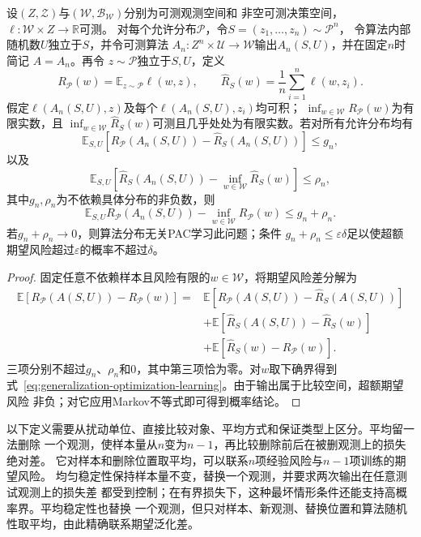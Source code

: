 \begin{theorem}[期望泛化差与经验最优性]
\label{thm:generalization-optimization-learning}
设$(Z,\mathcal Z)$与$(\mathcal W,\mathcal B_{\mathcal W})$分别为可测观测空间和
非空可测决策空间，$\ell:\mathcal W\times Z\to\mathbb R$可测。
对每个允许分布$\mathcal P$，令$S=(z_1,\ldots,z_n)\sim\mathcal P^n$，
令算法内部随机数$U$独立于$S$，并令可测算法
$A_n:Z^n\times\mathcal U\to\mathcal W$输出$A_n(S,U)$，并在固定$n$时简记
$A=A_n$。再令
$z\sim\mathcal P$独立于$S,U$，定义
\[
 R_{\mathcal P}(w)=\mathbb E_{z\sim\mathcal P}\ell(w,z),
 \qquad
 \hat R_S(w)=\frac1n\sum_{i=1}^n\ell(w,z_i).
\]
假定$\ell(A_n(S,U),z)$及每个$\ell(A_n(S,U),z_i)$均可积；
$\inf_{w\in\mathcal W}R_{\mathcal P}(w)$为有限实数，且
$\inf_{w\in\mathcal W}\hat R_S(w)$可测且几乎处处为有限实数。若对所有允许分布均有
\[
 \mathbb E_{S,U}[R_{\mathcal P}(A_n(S,U))-\hat R_S(A_n(S,U))]\leq g_n,
\]
以及
\[
 \mathbb E_{S,U}\!\left[\hat R_S(A_n(S,U))-
 \inf_{w\in\mathcal W}\hat R_S(w)\right]\leq\rho_n,
\]
其中$g_n,\rho_n$为不依赖具体分布的非负数，则
\begin{equation}
 \mathbb E_{S,U}R_{\mathcal P}(A_n(S,U))-
 \inf_{w\in\mathcal W}R_{\mathcal P}(w)
 \leq g_n+\rho_n.
 \label{eq:generalization-optimization-learning}
\end{equation}
若$g_n+\rho_n\to0$，则算法分布无关PAC学习此问题；条件
$g_n+\rho_n\leq\varepsilon\delta$足以使超额期望风险超过$\varepsilon$的概率不超过$\delta$。
\end{theorem}
\begin{proof}
固定任意不依赖样本且风险有限的$w\in\mathcal W$，将期望风险差分解为
\begin{align*}
 \mathbb E[R_{\mathcal P}(A(S,U))-R_{\mathcal P}(w)]
 ={}&\mathbb E[R_{\mathcal P}(A(S,U))-\hat R_S(A(S,U))]\\
 &+\mathbb E[\hat R_S(A(S,U))-\hat R_S(w)]\\
 &+\mathbb E[\hat R_S(w)-R_{\mathcal P}(w)].
\end{align*}
三项分别不超过$g_n$、$\rho_n$和0，其中第三项恰为零。对$w$取下确界得到
式~\eqref{eq:generalization-optimization-learning}。由于输出属于比较空间，超额期望风险
非负；对它应用Markov不等式即可得到概率结论。
\end{proof}

以下定义需要从扰动单位、直接比较对象、平均方式和保证类型上区分。平均留一法删除
一个观测，使样本量从$n$变为$n-1$，再比较删除前后在被删观测上的损失绝对差。
它对样本和删除位置取平均，可以联系$n$项经验风险与$n-1$项训练的期望风险。
均匀稳定性保持样本量不变，替换一个观测，并要求两次输出在任意测试观测上的损失差
都受到控制；在有界损失下，这种最坏情形条件还能支持高概率界。平均稳定性也替换
一个观测，但只对样本、新观测、替换位置和算法随机性取平均，由此精确联系期望泛化差。

